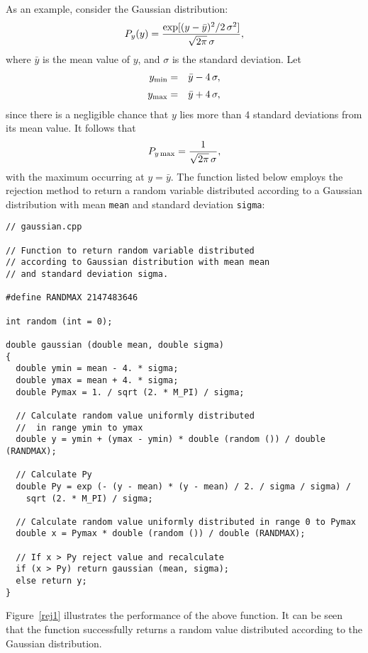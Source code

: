 As an example, consider the Gaussian distribution:
\begin{equation}
P_y(y) =\frac{{\rm exp}[(y-\bar{y})^2/2\,\sigma^2]}{\sqrt{2\pi}\,\sigma},
\end{equation}
where $\bar{y}$ is the mean value of $y$, and $\sigma$ is the standard deviation.
Let
\begin{eqnarray}
y_{\rm min} &=& \bar{y}-4\,\sigma,\\[0.5ex]
y_{\rm max} &=& \bar{y}+4\,\sigma,
\end{eqnarray}
since there is a negligible chance that $y$ lies more than 4 standard deviations
from its mean value.
It follows that
\begin{equation}
P_{y\,{\rm max}} = \frac{1}{\sqrt{2\pi}\,\sigma},
\end{equation}
with the maximum occurring at $y=\bar{y}$.
The function listed below employs the rejection method to return a
random variable distributed according to a Gaussian distribution
with mean {\tt mean} and standard deviation {\tt sigma}:
{\small\begin{verbatim}
// gaussian.cpp

// Function to return random variable distributed
// according to Gaussian distribution with mean mean
// and standard deviation sigma.

#define RANDMAX 2147483646

int random (int = 0);

double gaussian (double mean, double sigma)
{
  double ymin = mean - 4. * sigma;
  double ymax = mean + 4. * sigma;
  double Pymax = 1. / sqrt (2. * M_PI) / sigma;

  // Calculate random value uniformly distributed 
  //  in range ymin to ymax
  double y = ymin + (ymax - ymin) * double (random ()) / double (RANDMAX);

  // Calculate Py
  double Py = exp (- (y - mean) * (y - mean) / 2. / sigma / sigma) /
    sqrt (2. * M_PI) / sigma;

  // Calculate random value uniformly distributed in range 0 to Pymax
  double x = Pymax * double (random ()) / double (RANDMAX);

  // If x > Py reject value and recalculate
  if (x > Py) return gaussian (mean, sigma);
  else return y;
}
\end{verbatim}}
\noindent Figure~\ref{rej1} illustrates the performance of the above function. It can be seen
that the function successfully returns a random value distributed according to the Gaussian distribution.

